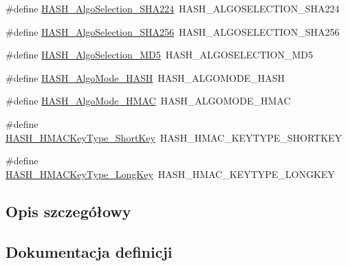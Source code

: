 \begin{DoxyCompactItemize}
\#define \hyperlink{group___h_a_l___h_a_s_h___aliased___functions_gaf8b9faddbf24e087ec70742275a16e97}{H\+A\+S\+H\+\_\+\+Algo\+Selection\+\_\+\+S\+H\+A224}~H\+A\+S\+H\+\_\+\+A\+L\+G\+O\+S\+E\+L\+E\+C\+T\+I\+O\+N\+\_\+\+S\+H\+A224
\item 
\#define \hyperlink{group___h_a_l___h_a_s_h___aliased___functions_ga4dd93835c16dcffba7e303a2412d58ad}{H\+A\+S\+H\+\_\+\+Algo\+Selection\+\_\+\+S\+H\+A256}~H\+A\+S\+H\+\_\+\+A\+L\+G\+O\+S\+E\+L\+E\+C\+T\+I\+O\+N\+\_\+\+S\+H\+A256
\item 
\#define \hyperlink{group___h_a_l___h_a_s_h___aliased___functions_gac443db7ebfff6d660b9321c59ecf48ed}{H\+A\+S\+H\+\_\+\+Algo\+Selection\+\_\+\+M\+D5}~H\+A\+S\+H\+\_\+\+A\+L\+G\+O\+S\+E\+L\+E\+C\+T\+I\+O\+N\+\_\+\+M\+D5
\item 
\#define \hyperlink{group___h_a_l___h_a_s_h___aliased___functions_ga4de18ef48bad8fe403226abe769bd921}{H\+A\+S\+H\+\_\+\+Algo\+Mode\+\_\+\+H\+A\+SH}~H\+A\+S\+H\+\_\+\+A\+L\+G\+O\+M\+O\+D\+E\+\_\+\+H\+A\+SH
\item 
\#define \hyperlink{group___h_a_l___h_a_s_h___aliased___functions_ga70224c1ea0eef2f45363f92fc001a875}{H\+A\+S\+H\+\_\+\+Algo\+Mode\+\_\+\+H\+M\+AC}~H\+A\+S\+H\+\_\+\+A\+L\+G\+O\+M\+O\+D\+E\+\_\+\+H\+M\+AC
\item 
\#define \hyperlink{group___h_a_l___h_a_s_h___aliased___functions_ga75d858a8b5b891edc321486eebe74692}{H\+A\+S\+H\+\_\+\+H\+M\+A\+C\+Key\+Type\+\_\+\+Short\+Key}~H\+A\+S\+H\+\_\+\+H\+M\+A\+C\+\_\+\+K\+E\+Y\+T\+Y\+P\+E\+\_\+\+S\+H\+O\+R\+T\+K\+EY
\item 
\#define \hyperlink{group___h_a_l___h_a_s_h___aliased___functions_ga99296878d9ed1d3ede590fdeef8f8394}{H\+A\+S\+H\+\_\+\+H\+M\+A\+C\+Key\+Type\+\_\+\+Long\+Key}~H\+A\+S\+H\+\_\+\+H\+M\+A\+C\+\_\+\+K\+E\+Y\+T\+Y\+P\+E\+\_\+\+L\+O\+N\+G\+K\+EY
\end{DoxyCompactItemize}


\subsection{Opis szczegółowy}


\subsection{Dokumentacja definicji}
\mbox{\label{group___h_a_l___h_a_s_h___aliased___functions_ga65a1583bf661ed4a6ffbf79f9cd73ff3}} 
